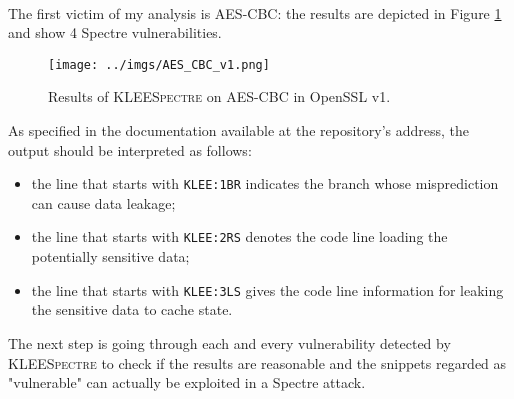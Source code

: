 \documentclass[12pt,a4paper]{book}
\theoremstyle{definition}
\begin{document}
	\paragraph{}The first victim of my analysis is AES-CBC: the results are depicted in Figure \ref{fig:result_cbc_v1} and show 4 Spectre vulnerabilities. 
	\begin{figure}
		\centering
		\texttt{[image: ../imgs/AES\_CBC\_v1.png]}
		\captionsetup{width=.9\linewidth}
		\caption{Results of \textsc{KLEESpectre} on AES-CBC in OpenSSL v1.}
		\label{fig:result_cbc_v1}
	\end{figure}
	As specified in the documentation available at the repository's address, the output should be interpreted as follows:
	\begin{itemize}
		\item the line that starts with \texttt{KLEE:1BR} indicates the branch whose misprediction can cause data leakage;
		\item the line that starts with \texttt{KLEE:2RS} denotes the code line loading the potentially sensitive data;
		\item the line that starts with \texttt{KLEE:3LS} gives the code line information for leaking the sensitive data to cache state.
	\end{itemize}
	The next step is going through each and every vulnerability detected by \textsc{KLEESpectre} to check if the results are reasonable and the snippets regarded as "vulnerable" can actually be exploited in a Spectre attack. 
	
\end{document}
